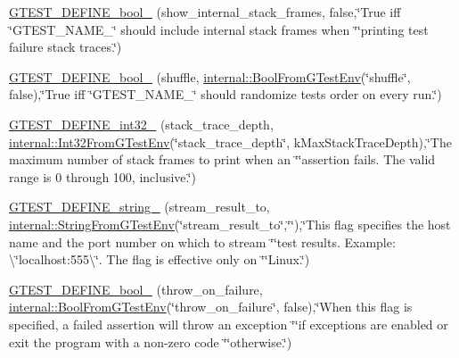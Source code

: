 \begin{DoxyCompactItemize}
\item 
\hyperlink{namespacetesting_a5982e64522de6804cbf5d1732fd62751}{G\+T\+E\+S\+T\+\_\+\+D\+E\+F\+I\+N\+E\+\_\+bool\+\_\+} (show\+\_\+internal\+\_\+stack\+\_\+frames, false,\char`\"{}True iff \char`\"{}G\+T\+E\+S\+T\+\_\+\+N\+A\+M\+E\+\_\+\char`\"{} should include internal stack frames when \char`\"{}\char`\"{}printing test failure stack traces.\char`\"{})
\item 
\hyperlink{namespacetesting_acc11444cd1c18500658a35e02d4f2cf9}{G\+T\+E\+S\+T\+\_\+\+D\+E\+F\+I\+N\+E\+\_\+bool\+\_\+} (shuffle, \hyperlink{namespacetesting_1_1internal_a67132cdce23fb71b6c38ee34ef81eb4c}{internal\+::\+Bool\+From\+G\+Test\+Env}(\char`\"{}shuffle\char`\"{}, false),\char`\"{}True iff \char`\"{}G\+T\+E\+S\+T\+\_\+\+N\+A\+M\+E\+\_\+\char`\"{} should randomize tests\textquotesingle{} order on every run.\char`\"{})
\item 
\hyperlink{namespacetesting_aaedd7015b957f3c37662c289b645e7d9}{G\+T\+E\+S\+T\+\_\+\+D\+E\+F\+I\+N\+E\+\_\+int32\+\_\+} (stack\+\_\+trace\+\_\+depth, \hyperlink{namespacetesting_1_1internal_a0f7e728793f9e6cb0aa2b69eaa468bf3}{internal\+::\+Int32\+From\+G\+Test\+Env}(\char`\"{}stack\+\_\+trace\+\_\+depth\char`\"{}, k\+Max\+Stack\+Trace\+Depth),\char`\"{}The maximum number of stack frames to print when an \char`\"{}\char`\"{}assertion fails.  The valid range is 0 through 100, inclusive.\char`\"{})
\item 
\hyperlink{namespacetesting_a0422a6f971513cf559a8575a0533b235}{G\+T\+E\+S\+T\+\_\+\+D\+E\+F\+I\+N\+E\+\_\+string\+\_\+} (stream\+\_\+result\+\_\+to, \hyperlink{namespacetesting_1_1internal_ac54dabc540bf79c2de91add679bfb93b}{internal\+::\+String\+From\+G\+Test\+Env}(\char`\"{}stream\+\_\+result\+\_\+to\char`\"{},\char`\"{}\char`\"{}),\char`\"{}This flag specifies the host name and the port number on which to stream \char`\"{}\char`\"{}test results. Example\+: \textbackslash{}\char`\"{}localhost\+:555\textbackslash{}\char`\"{}. The flag is effective only on \char`\"{}\char`\"{}Linux.\char`\"{})
\item 
\hyperlink{namespacetesting_a05ff4385edff6d44f6823f5eade7abe2}{G\+T\+E\+S\+T\+\_\+\+D\+E\+F\+I\+N\+E\+\_\+bool\+\_\+} (throw\+\_\+on\+\_\+failure, \hyperlink{namespacetesting_1_1internal_a67132cdce23fb71b6c38ee34ef81eb4c}{internal\+::\+Bool\+From\+G\+Test\+Env}(\char`\"{}throw\+\_\+on\+\_\+failure\char`\"{}, false),\char`\"{}When this flag is specified, a failed assertion will throw an exception \char`\"{}\char`\"{}if exceptions are enabled or exit the program with a non-\/zero code \char`\"{}\char`\"{}otherwise.\char`\"{})

\end{DoxyCompactItemize}
